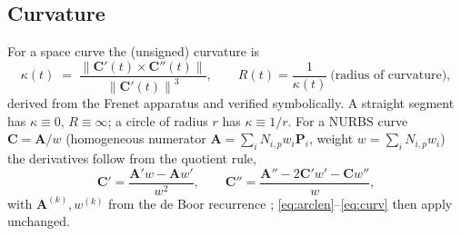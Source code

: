 \documentclass[11pt,a4paper]{article}
\numberwithin{equation}{section}
\newcommand{\norm}[1]{\left\lVert #1 \right\rVert}
\newcommand{\vv}[1]{\mathbf{#1}}
\begin{document}
\subsection{Curvature}
For a space curve the (unsigned) curvature is
\begin{equation}
\label{eq:curv}
\kappa(t) \;=\; \frac{\norm{\vv{C}'(t)\times\vv{C}''(t)}}{\norm{\vv{C}'(t)}^{3}},
\qquad R(t)=\frac{1}{\kappa(t)}\ \text{(radius of curvature)},
\end{equation}
derived from the Frenet apparatus and verified symbolically. A straight segment
has $\kappa\equiv0$, $R\equiv\infty$; a circle of radius $r$ has $\kappa\equiv
1/r$. For a NURBS curve $\vv{C}=\vv{A}/w$ (homogeneous numerator
$\vv{A}=\sum_iN_{i,p}w_i\vv{P}_i$, weight $w=\sum_iN_{i,p}w_i$) the derivatives
follow from the quotient rule,
\begin{equation}
\label{eq:nurbsder}
\vv{C}'=\frac{\vv{A}'w-\vv{A}w'}{w^2},\qquad
\vv{C}''=\frac{\vv{A}''-2\vv{C}'w'-\vv{C}w''}{w},
\end{equation}
with $\vv{A}^{(k)},w^{(k)}$ from the de Boor recurrence \cite{PieglTiller1997};
\eqref{eq:arclen}--\eqref{eq:curv} then apply unchanged.
\end{document}
